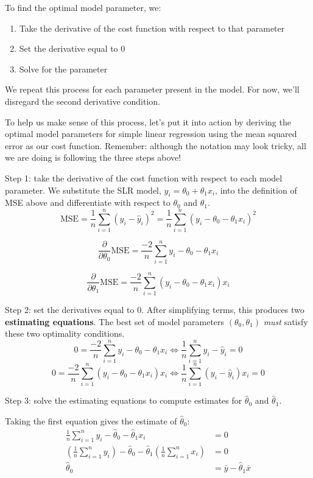 \documentclass[
  letterpaper,
  DIV=11,
  numbers=noendperiod]{scrreprt}
\providecommand{\tightlist}{%
  \setlength{\itemsep}{0pt}\setlength{\parskip}{0pt}}\usepackage{longtable,booktabs,array}
\begin{document}
To find the optimal model parameter, we:

\begin{enumerate}
\def\labelenumi{\arabic{enumi}.}
\tightlist
\item
  Take the derivative of the cost function with respect to that
  parameter
\item
  Set the derivative equal to 0
\item
  Solve for the parameter
\end{enumerate}

We repeat this process for each parameter present in the model. For now,
we'll disregard the second derivative condition.

To help us make sense of this process, let's put it into action by
deriving the optimal model parameters for simple linear regression using
the mean squared error as our cost function. Remember: although the
notation may look tricky, all we are doing is following the three steps
above!

Step 1: take the derivative of the cost function with respect to each
model parameter. We substitute the SLR model,
\(\hat{y}_i = \theta_0+\theta_1 x_i\), into the definition of MSE above
and differentiate with respect to \(\theta_0\) and \(\theta_1\).
\[\text{MSE} = \frac{1}{n} \sum_{i=1}^{n} (y_i - \hat{y}_i)^2 = \frac{1}{n} \sum_{i=1}^{n} (y_i - \theta_0 - \theta_1 x_i)^2\]

\[\frac{\partial}{\partial \theta_0} \text{MSE} = \frac{-2}{n} \sum_{i=1}^{n} y_i - \theta_0 - \theta_1 x_i\]

\[\frac{\partial}{\partial \theta_1} \text{MSE} = \frac{-2}{n} \sum_{i=1}^{n} (y_i - \theta_0 - \theta_1 x_i)x_i\]

Step 2: set the derivatives equal to 0. After simplifying terms, this
produces two \textbf{estimating equations}. The best set of model
parameters \((\theta_0, \theta_1)\) \emph{must} satisfy these two
optimality conditions.
\[0 = \frac{-2}{n} \sum_{i=1}^{n} y_i - \theta_0 - \theta_1 x_i \Longleftrightarrow \frac{1}{n}\sum_{i=1}^{n} y_i - \hat{y}_i = 0\]
\[0 = \frac{-2}{n} \sum_{i=1}^{n} (y_i - \theta_0 - \theta_1 x_i)x_i \Longleftrightarrow \frac{1}{n}\sum_{i=1}^{n} (y_i - \hat{y}_i)x_i = 0\]

Step 3: solve the estimating equations to compute estimates for
\(\hat{\theta}_0\) and \(\hat{\theta}_1\).

Taking the first equation gives the estimate of \(\hat{\theta}_0\):
\[\begin{align}
\frac{1}{n} \sum_{i=1}^n y_i - \hat{\theta}_0 - \hat{\theta}_1 x_i &= 0 \\
\left(\frac{1}{n} \sum_{i=1}^n y_i \right) - \hat{\theta}_0 - \hat{\theta}_1\left(\frac{1}{n} \sum_{i=1}^n x_i \right) &= 0 \\
\hat{\theta}_0 &= \bar{y} - \hat{\theta}_1 \bar{x}
\end{align}\]
\end{document}
